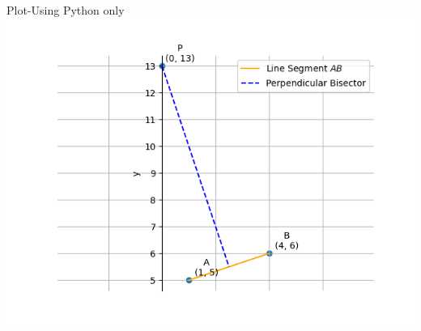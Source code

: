 \documentclass{beamer}
\begin{document}
\begin{frame}{Plot-Using Python only}
    \centering
    \includegraphics[width=\columnwidth, height=0.8\textheight, keepaspectratio]{Figs/plot(py).png}     
\end{frame}
\end{document}
